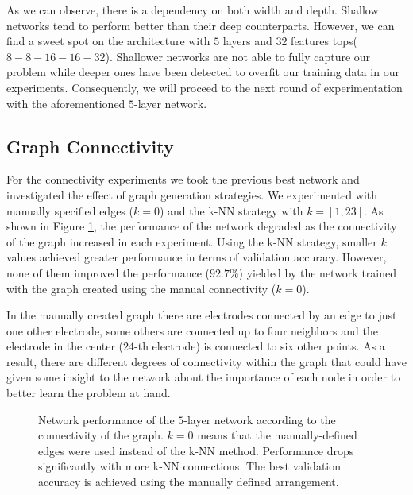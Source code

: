 As we can observe, there is a dependency on both width and depth. Shallow networks tend to perform better than their deep counterparts. However, we can find a sweet spot on the architecture with $5$ layers and $32$ features tops($8-8-16-16-32$). Shallower networks are not able to fully capture our problem while deeper ones have been detected to overfit our training data in our experiments. Consequently, we will proceed to the next round of experimentation with the aforementioned $5$-layer network.

\subsection{Graph Connectivity}

For the connectivity experiments we took the previous best network and investigated the effect of graph generation strategies. We experimented with manually specified edges ($k=0$) and the \ac{k-NN} strategy with $k = [1, 23]$. As shown in Figure \ref{fig:experiments_connectivity}, the performance of the network degraded as the connectivity of the graph increased in each experiment. Using the \ac{k-NN} strategy, smaller $k$ values achieved greater performance in terms of validation accuracy. However, none of them improved the performance ($92.7\%$) yielded by the network trained with the graph created using the manual connectivity ($k = 0$).

In the manually created graph there are electrodes connected by an edge to just one other electrode, some others are connected up to four neighbors and the electrode in the center ($24$-th electrode) is connected to six other points. As a result, there are different degrees of connectivity within the graph that could have given some insight to the network about the importance of each node in order to better learn the problem at hand.

\begin{figure}[!htb]
  \caption{Network performance of the $5$-layer network according to the connectivity of the graph. $k=0$ means that the manually-defined edges were used instead of the \ac{k-NN} method. Performance drops significantly with more \ac{k-NN} connections. The best validation accuracy is achieved using the manually defined arrangement.}
  \label{fig:experiments_connectivity}
\end{figure}

